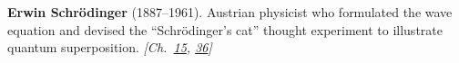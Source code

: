 \nobelphysics \textbf{Erwin Schrödinger} (1887–1961). Austrian physicist who formulated the wave equation and devised the ``Schr\"{o}dinger's cat'' thought experiment to illustrate quantum superposition. \emph{[Ch.~\hyperref[ch:envelopeparadox]{15}, \hyperref[ch:qftvsgr]{36}]}

